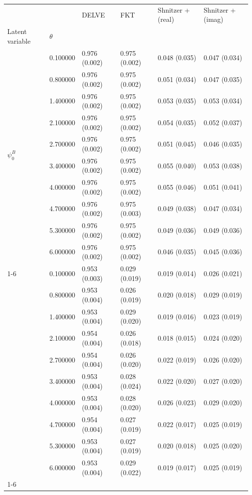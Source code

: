 \begin{tabular}{llllll}
\toprule
 &  & DELVE & FKT & Shnitzer + (real) & Shnitzer + (imag) \\
Latent variable & $\theta$ &  &  &  &  \\
\midrule
\multirow[t]{10}{*}{$\psi^B_0$} & 0.100000 & 0.976 (0.002) & 0.975 (0.002) & 0.048 (0.035) & 0.047 (0.034) \\
 & 0.800000 & 0.976 (0.002) & 0.975 (0.002) & 0.051 (0.034) & 0.047 (0.035) \\
 & 1.400000 & 0.976 (0.002) & 0.975 (0.002) & 0.053 (0.035) & 0.053 (0.034) \\
 & 2.100000 & 0.976 (0.002) & 0.975 (0.002) & 0.054 (0.035) & 0.052 (0.037) \\
 & 2.700000 & 0.976 (0.002) & 0.975 (0.002) & 0.051 (0.045) & 0.046 (0.035) \\
 & 3.400000 & 0.976 (0.002) & 0.975 (0.002) & 0.055 (0.040) & 0.053 (0.038) \\
 & 4.000000 & 0.976 (0.002) & 0.975 (0.002) & 0.055 (0.046) & 0.051 (0.041) \\
 & 4.700000 & 0.976 (0.002) & 0.975 (0.003) & 0.049 (0.038) & 0.047 (0.034) \\
 & 5.300000 & 0.976 (0.002) & 0.975 (0.002) & 0.049 (0.036) & 0.049 (0.036) \\
 & 6.000000 & 0.976 (0.002) & 0.975 (0.002) & 0.046 (0.035) & 0.045 (0.036) \\
\cline{1-6}
\multirow[t]{10}{*}{$\psi^B_1$} & 0.100000 & 0.953 (0.003) & 0.029 (0.019) & 0.019 (0.014) & 0.026 (0.021) \\
 & 0.800000 & 0.953 (0.004) & 0.026 (0.019) & 0.020 (0.018) & 0.029 (0.019) \\
 & 1.400000 & 0.953 (0.004) & 0.029 (0.020) & 0.019 (0.016) & 0.023 (0.019) \\
 & 2.100000 & 0.954 (0.004) & 0.026 (0.018) & 0.018 (0.015) & 0.024 (0.020) \\
 & 2.700000 & 0.954 (0.004) & 0.026 (0.020) & 0.022 (0.019) & 0.026 (0.020) \\
 & 3.400000 & 0.953 (0.004) & 0.028 (0.024) & 0.022 (0.020) & 0.027 (0.020) \\
 & 4.000000 & 0.953 (0.004) & 0.028 (0.020) & 0.026 (0.023) & 0.029 (0.020) \\
 & 4.700000 & 0.954 (0.004) & 0.027 (0.019) & 0.022 (0.017) & 0.025 (0.019) \\
 & 5.300000 & 0.953 (0.004) & 0.027 (0.019) & 0.020 (0.018) & 0.025 (0.020) \\
 & 6.000000 & 0.953 (0.004) & 0.029 (0.022) & 0.019 (0.017) & 0.025 (0.019) \\
\cline{1-6}
\bottomrule
\end{tabular}
